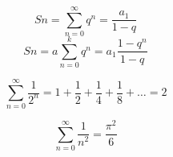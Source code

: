 
\begin{multicols}{2}
  $$\boxed{Sn= \sum_{n=0}^{\infty} q^n = \dfrac{a_1}{1-q}}$$
  \columnbreak
  $$\boxed{Sn= a\sum_{n=0}^{k} q^n = a_1 \dfrac{1-q^{n}}{1-q}}$$
\end{multicols}





$$
\sum_{n=0}^{\infty} \dfrac{1}{2^n} = 1+ \dfrac{1}{2} + \dfrac{1}{4} + \dfrac{1}{8} + \ldots = 2
$$

$$
\sum_{n=0}^{\infty} \dfrac{1}{n^2} = \dfrac{\pi^2}{6}
$$
